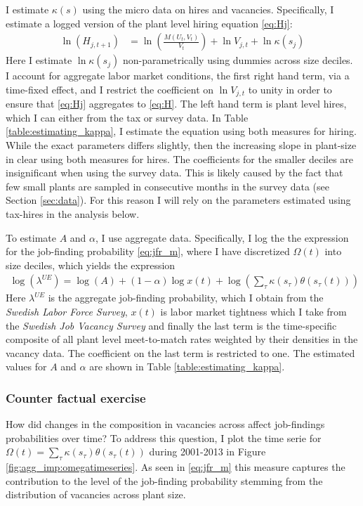 I estimate $\kappa (s)$ using the micro data on hires and vacancies. Specifically, I estimate a logged version of the plant level hiring equation \eqref{eq:Hj}:
\begin{align}
\ln(H_{j,t+1})&= \ln \left( \frac{M(U_t,V_t)}{V_t} \right)+\ln V_{j,t} +\ln \kappa(s_{j}) 
\end{align}
Here I estimate $\ln \kappa(s_j)$ non-parametrically using dummies across size deciles. I account for aggregate labor market conditions, the first right hand term, via a time-fixed effect, and I restrict the coefficient on $\ln V_{j,t}$ to unity in order to ensure that \eqref{eq:Hj} aggregates to \eqref{eq:H}. The left hand term is plant level hires, which I can either from the tax or survey data. In Table \ref{table:estimating_kappa}, I estimate the equation using both measures for hiring. While the exact parameters differs slightly, then the increasing slope in plant-size in clear using both measures for hires. The coefficients for the smaller deciles are insignificant when using the survey data. This is likely caused by the fact that few small plants are sampled in consecutive months in the survey data (see Section \ref{sec:data}). For this reason I will rely on the parameters estimated using tax-hires in the analysis below.

To estimate $A$ and $\alpha$, I use aggregate data. Specifically, I log the the expression for the job-finding probability \eqref{eq:jfr_m}, where I have discretized $\Omega (t)$ into size deciles, which yields the expression
\begin{align}
\log(\lambda^{UE}) = \log(A)+(1-\alpha)\log x(t)+\log \left( \sum_{\tau} \kappa(s_\tau) \theta(s_\tau(t))  \right)
\end{align}
Here $\lambda^{UE}$ is the aggregate job-finding probability, which I obtain from the \emph{Swedish Labor Force Survey}, $x(t)$ is labor market tightness which I take from the \emph{Swedish Job Vacancy Survey} and finally the last term is the time-specific composite of all plant level meet-to-match rates weighted by their densities in the vacancy data. The coefficient on the last term is restricted to one. The estimated values for $A$ and $\alpha$ are shown in Table \ref{table:estimating_kappa}.

\subsubsection{Counter factual exercise}
How did changes in the composition in vacancies across affect job-findings probabilities over time? To address this question, I plot the time serie for $\Omega(t)=\sum_{\tau} \kappa(s_\tau) \theta(s_\tau(t))$ during 2001-2013 in Figure \ref{fig:agg_imp:omegatimeseries}. As seen in \eqref{eq:jfr_m} this measure captures the contribution to the level of the job-finding probability stemming from the distribution of vacancies across plant size.

